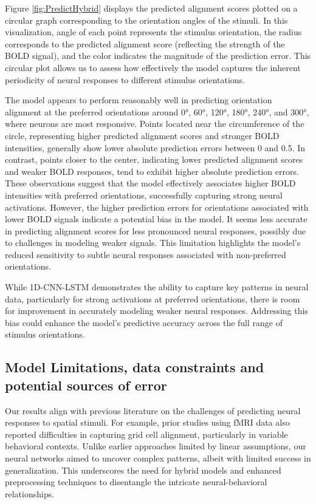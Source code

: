\documentclass[a4paper]{article}
\begin{document}
\noindent Figure \ref{fig:PredictHybrid} displays the predicted alignment scores plotted on a circular graph corresponding to the orientation angles of the stimuli. In this visualization, angle of each point represents the stimulus orientation, the radius corresponds to the predicted alignment score (reflecting the strength of the BOLD signal), and the color indicates the magnitude of the prediction error. This circular plot allows us to assess how effectively the model captures the inherent periodicity of neural responses to different stimulus orientations.

The model appears to perform reasonably well in predicting orientation alignment at the preferred orientations around 0°, 60°, 120°, 180°, 240°, and 300°, where neurons are most responsive. Points located near the circumference of the circle, representing higher predicted alignment scores and stronger BOLD intensities, generally show lower absolute prediction errors between 0 and 0.5. In contrast, points closer to the center, indicating lower predicted alignment scores and weaker BOLD responses, tend to exhibit higher absolute prediction errors. These observations suggest that the model effectively associates higher BOLD intensities with preferred orientations, successfully capturing strong neural activations. However, the higher prediction errors for orientations associated with lower BOLD signals indicate a potential bias in the model. It seems less accurate in predicting alignment scores for less pronounced neural responses, possibly due to challenges in modeling weaker signals. This limitation highlights the model's reduced sensitivity to subtle neural responses associated with non-preferred orientations.

While 1D-CNN-LSTM demonstrates the ability to capture key patterns in neural data, particularly for strong activations at preferred orientations, there is room for improvement in accurately modeling weaker neural responses. Addressing this bias could enhance the model's predictive accuracy across the full range of stimulus orientations.


\subsection{\textbf{Model Limitations, data constraints and potential sources of error}}
Our results align with previous literature on the challenges of predicting neural responses to spatial stimuli. For example, prior studies using fMRI data also reported difficulties in capturing grid cell alignment, particularly in variable behavioral contexts. Unlike earlier approaches limited by linear assumptions, our neural networks aimed to uncover complex patterns, albeit with limited success in generalization. This underscores the need for hybrid models and enhanced preprocessing techniques to disentangle the intricate neural-behavioral relationships.
\end{document}
